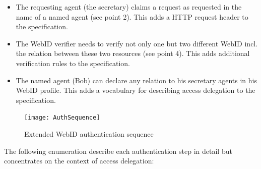 \documentclass[a4paper]{llncs}
\begin{document}
\begin{itemize}
    \item The requesting agent (the secretary) claims a request as requested in the name of a named agent (see point 2).
        This adds a HTTP request header to the specification.
    \item The WebID verifier needs to verify not only one but two different WebID incl. the relation between these two resources (see point 4).
        This adds additional verification rules to the specification.
    \item The named agent (Bob) can declare any relation to his secretary agents in his WebID profile.
        This adds a vocabulary for describing access delegation to the specification.
\end{itemize}

\begin{figure}[htb]
  \centering
  \texttt{[image: AuthSequence]}
  \caption{Extended WebID authentication sequence}
  \label{fig:AuthSequence}
\end{figure}

The following enumeration describe each authentication step in detail but concentrates on the context of access delegation:
\end{document}
